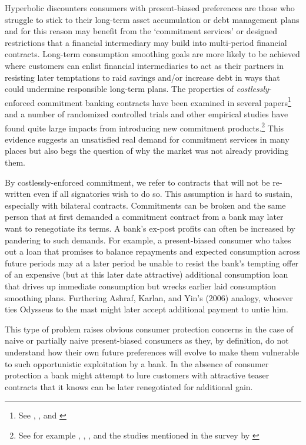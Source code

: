 \documentclass[11pt,english]{article}
\theoremstyle{plain}
\theoremstyle{definition}
\begin{document}
Hyperbolic discounters \textendash{} consumers with present-biased
preferences \textendash{} are those who struggle to stick to their
long-term asset accumulation or debt management plans and for this
reason may benefit from the `commitment services' or designed restrictions
that a financial intermediary may build into multi-period financial
contracts. Long-term consumption smoothing goals are more likely to
be achieved where customers can enlist financial intermediaries to
act as their partners in resisting later temptations to raid savings
and/or increase debt in ways that could undermine responsible long-term
plans. The properties of \textit{costlessly}-enforced commitment banking
contracts have been examined in several papers\footnote{See \citet{laibson_debt_2003}, \citet{amador_commitment_2006}, and
\citet{basu_commitment_2014}} and a number of randomized controlled trials and other empirical
studies have found quite large impacts from introducing new commitment
products.\footnote{See for example \citet{ariely_procrastination_2002}, \citet{thaler_save_2004},
\citet{ashraf_tying_2006}, \citet{bauer_behavioral_2012} and the
studies mentioned in the survey by \citet{bryan_commitment_2010}} This evidence suggests an unsatisfied real demand for commitment
services in many places but also begs the question of why the market
was not already providing them.

By costlessly-enforced commitment, we refer to contracts that will
not be re-written even if all signatories wish to do so. This assumption
is hard to sustain, especially with bilateral contracts. Commitments
can be broken and the same person that at first demanded a commitment
contract from a bank may later want to renegotiate its terms. A bank's
ex-post profits can often be increased by pandering to such demands.
For example, a present-biased consumer who takes out a loan that promises
to balance repayments and expected consumption across future periods
may at a later period be unable to resist the bank's tempting offer
of an expensive (but at this later date attractive) additional consumption
loan that drives up immediate consumption but wrecks earlier laid
consumption smoothing plans. Furthering Ashraf, Karlan, and Yin's
(2006) analogy, whoever ties Odysseus to the mast might later accept
additional payment to untie him.

This type of problem raises obvious consumer protection concerns in
the case of naive or partially naive present-biased consumers as they,
by definition, do not understand how their own future preferences
will evolve to make them vulnerable to such opportunistic exploitation
by a bank. In the absence of consumer protection a bank might attempt
to lure customers with attractive teaser contracts that it knows can
be later renegotiated for additional gain.
\end{document}
